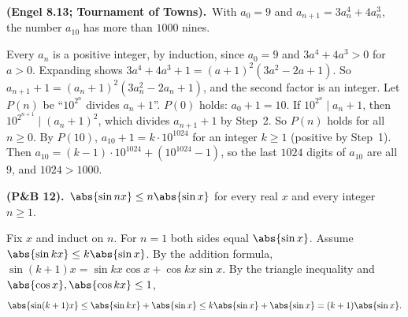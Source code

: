 \documentclass[10pt]{scrartcl}
\begin{document}
\begin{prob}\textbf{ (Engel 8.13; Tournament of Towns).}\ With $a_0 = 9$ and $a_{n+1} = 3a_n^4 + 4a_n^3$, the number $a_{10}$ has more than $1000$ nines.\par
{}
\begin{steps}
  \ii Every $a_n$ is a positive integer, by induction, since $a_0 = 9$ and $3a^4 + 4a^3 > 0$ for $a > 0$.
  \ii Expanding shows $3a^4 + 4a^3 + 1 = (a+1)^2 (3a^2 - 2a + 1)$. So $a_{n+1} + 1 = (a_n + 1)^2 (3a_n^2 - 2a_n + 1)$, and the second factor is an integer.
  \ii Let $P(n)$ be ``$10^{2^n}$ divides $a_n + 1$''. $P(0)$ holds: $a_0 + 1 = 10$. If $10^{2^n} \mid a_n + 1$, then $10^{2^{n+1}} \mid (a_n + 1)^2$, which divides $a_{n+1} + 1$ by Step~2. So $P(n)$ holds for all $n \geq 0$.
  \ii By $P(10)$, $a_{10} + 1 = k \cdot 10^{1024}$ for an integer $k \geq 1$ (positive by Step~1). Then $a_{10} = (k-1) \cdot 10^{1024} + (10^{1024} - 1)$, so the last $1024$ digits of $a_{10}$ are all $9$, and $1024 > 1000$.
\end{steps}
\end{prob}

\begin{prob}\textbf{ (P\&B 12).}\ $\abs{\sin nx} \leq n \abs{\sin x}$ for every real $x$ and every integer $n \geq 1$.\par
{}
\begin{steps}
  \ii Fix $x$ and induct on $n$. For $n = 1$ both sides equal $\abs{\sin x}$.
  \ii Assume $\abs{\sin kx} \leq k\abs{\sin x}$. By the addition formula, $\sin(k+1)x = \sin kx \cos x + \cos kx \sin x$.
  \ii By the triangle inequality and $\abs{\cos x}, \abs{\cos kx} \leq 1$,
  \[ \abs{\sin(k+1)x} \leq \abs{\sin kx} + \abs{\sin x} \leq k\abs{\sin x} + \abs{\sin x} = (k+1)\abs{\sin x}. \]
\end{steps}
\end{prob}
\end{document}
